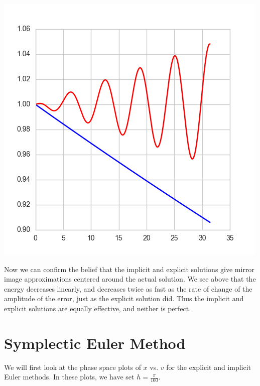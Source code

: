 \documentclass[12pt, letterpaper]{article}
\begin{document}
\begin{center}
\includegraphics[scale=0.8]{impEnergyWithErr.png}
\end{center}

Now we can confirm the belief that the implicit and explicit solutions give mirror image approximations centered around the actual solution. We see above that the energy decreases linearly, and decreases twice as fast as the rate of change of the amplitude of the error, just as the explicit solution did. Thus the implicit and explicit solutions are equally effective, and neither is perfect.

\section{Symplectic Euler Method}

We will first look at the phase space plots of $x$ vs. $v$ for the explicit and implicit Euler methods. In these plots, we have set $h=\frac{\pi}{100}$.
\end{document}
